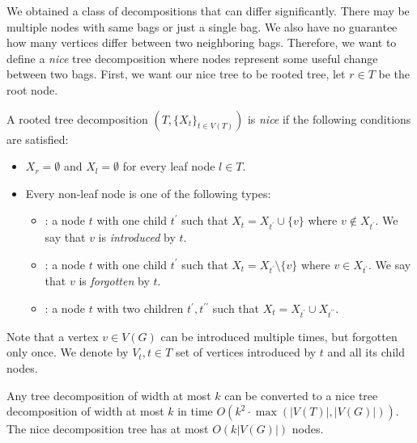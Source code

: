 We obtained a class of decompositions that can differ significantly.
There may be multiple nodes with same bags or just a single bag.
We also have no guarantee how many vertices differ between two neighboring bags.
Therefore, we want to define a \emph{nice} tree decomposition where nodes
represent some useful change between two bags.
First, we want our nice tree to be rooted tree,
let \( r \in T \) be the root node.
%
\begin{definition}
	A rooted tree decomposition
	\( (T, {\{X_t\}}_{t \in V ( T )}) \)
	is \emph{nice} if the following conditions are satisfied:
	\begin{itemize}
		\item \( X_r = \emptyset \) and \( X_l = \emptyset \) for every leaf node \( l \in T \).
		\item Every non-leaf node is one of the following types:
		      \begin{itemize}
			      \item \IntroduceVertexNode{}: a node \( t \) with one child \( t^\prime \)
			            such that \( X_t = X_{t^\prime} \cup \{v\} \) where \( v \not\in X_{t^\prime} \).
			            We say that \( v \) is \emph{introduced} by \( t \).
			      \item \ForgetVertexNode{}: a node \( t \) with one child \( t^\prime \)
			            such that \( X_t = X_{t^\prime} \setminus \{v\} \) where \( v \in X_{t^\prime} \).
			            We say that \( v \) is \emph{forgotten} by \( t \).
			      \item \JoinNode: a node \( t \) with two children \( t^\prime, t^{\prime\prime} \)
			            such that \( X_t = X_{t^\prime} \cup X_{t^{\prime\prime}} \).
		      \end{itemize}
	\end{itemize}
\end{definition}
%
Note that a vertex \( v \in V(G) \) can be introduced multiple times,
but forgotten only once.
We denote by \( V_t, t \in T \) set of vertices introduced by \( t \)
and all its child nodes.

\begin{lemma}
	Any tree decomposition of width at most \( k \) can be converted to
	a nice tree decomposition of width at most \( k \)
	in time \( O(k^2 \cdot \max(|V(T)|, |V(G)|)) \).
	The nice decomposition tree has at most \( O(k|V(G)|) \) nodes.
\end{lemma}

